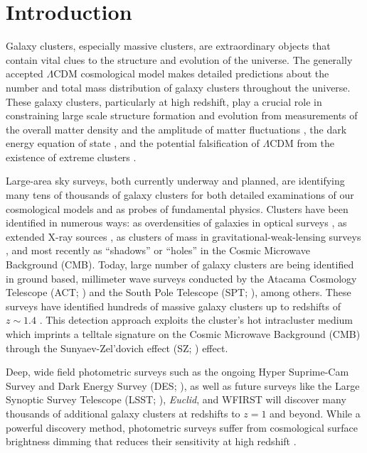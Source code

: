 \documentclass[apj, revtex4-1]{emulateapj}
\begin{document}
\section{Introduction}\label{sec:intro}
Galaxy clusters, especially massive clusters, are extraordinary objects that contain vital clues to the structure and evolution of the universe. The generally accepted $\Lambda$CDM cosmological model makes detailed predictions about the number and total mass distribution of galaxy clusters throughout the universe. These galaxy clusters, particularly at high redshift, play a crucial role in constraining large scale structure formation and evolution from measurements of the overall matter density and the amplitude of matter fluctuations , the dark energy equation of state , and the potential falsification of $\Lambda$CDM from the existence of extreme clusters .

Large-area sky surveys, both currently underway and planned, are identifying many tens of thousands of galaxy clusters for both detailed examinations of our cosmological models and as probes of fundamental physics. Clusters have been identified in numerous ways: as overdensities of galaxies in optical surveys , as extended X-ray sources , as clusters of mass in gravitational-weak-lensing surveys , and most recently as ``shadows'' or ``holes'' in the Cosmic Microwave Background (CMB).  Today, large number of galaxy clusters are being identified in ground based, millimeter wave surveys conducted by the Atacama Cosmology Telescope (ACT; \citealt{Swetz2011}) and the South Pole Telescope (SPT; \citealt{Carlstrom2011}), among others. These surveys have identified hundreds of massive galaxy clusters up to redshifts of $z \sim 1.4$ . This detection approach exploits the cluster's hot intracluster medium which imprints a telltale signature on the Cosmic Microwave Background (CMB) through the Sunyaev-Zel'dovich effect (SZ; \citealt{Sunyaev1972}) effect.

Deep, wide field photometric surveys such as the ongoing Hyper Suprime-Cam Survey \citep{Aihara2018a} and Dark Energy Survey (DES; \citealt{DES2005}), as well as future surveys like the Large Synoptic Survey Telescope (LSST; \citealt{LSST2012}), \textit{Euclid}, and WFIRST will discover many thousands of additional galaxy clusters at redshifts to $z=1$  and beyond. While a powerful discovery method, photometric surveys suffer from cosmological surface brightness dimming that reduces their sensitivity at high redshift .
\end{document}
